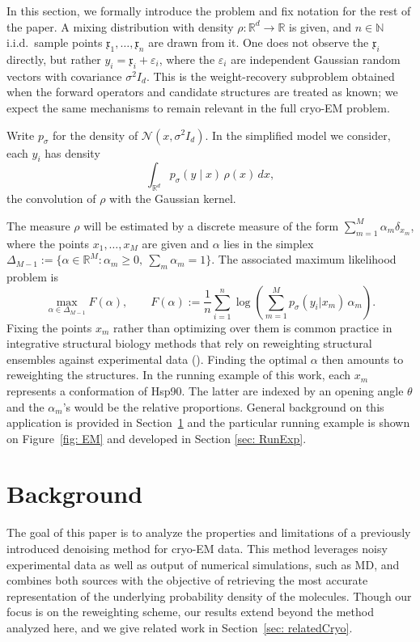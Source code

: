 \documentclass[12pt]{iopart}
\providecommand{\reals}{\mathbb{R}}
\providecommand{\eps}{\varepsilon}
\theoremstyle{remark}
\begin{document}
In this section, we formally introduce the problem and fix notation for the rest of the paper. A mixing distribution with
density $\rho:\reals^d\to\reals$ is given, and $n \in \mathbb{N}$ i.i.d.\ sample points
$\mathfrak{x}_1,\ldots,\mathfrak{x}_n$ are drawn from it. One does not
observe the $\mathfrak{x}_i$ directly, but rather
$y_i=\mathfrak{x}_i+\eps_i$, where the $\eps_i$ are independent Gaussian
random vectors with covariance $\sigma^2 I_d$. This is the weight-recovery
subproblem obtained when the forward operators and candidate structures are
treated as known; we expect the same mechanisms to remain relevant in the full
cryo-EM problem.




Write $p_\sigma$ for the density of $\mathcal{N}(x,\sigma^2 I_d)$.
In the simplified model we consider, each $y_i$ has density
\[
  \int_{\mathbb{R}^d} p_\sigma(y \mid x)\,\rho(x)\,dx,
\]
the convolution of $\rho$ with the Gaussian kernel.

The measure $\rho$ will be estimated by a discrete measure of the form
$\sum_{m=1}^M \alpha_m\delta_{x_m}$, where the points $x_1,\ldots,x_M$ are
given and $\alpha$ lies in the simplex
$\Delta_{M-1}:=\{\alpha\in\reals^M:\alpha_m\geq 0,\ \sum_m\alpha_m=1\}$.
The associated maximum likelihood problem is
\begin{equation}
\label{eq: MainOpt}
\max_{\alpha\in\Delta_{M-1}} F(\alpha),
\qquad
F(\alpha):=\frac1n\sum_{i=1}^n\log\!\left(\sum_{m=1}^M p_\sigma(y_i\vert x_m)\,\alpha_m\right).
\end{equation}
Fixing the points $x_m$ rather than optimizing over them is common practice in integrative structural biology methods that rely on reweighting structural ensembles against experimental data (\cite{bottaro2020integrating}). Finding the optimal $\alpha$
then amounts to reweighting the structures. 
In the running example of this work, each $x_m$ represents a conformation of Hsp90. The latter are indexed by an opening angle $\theta$ and the $\alpha_m$'s would be the relative proportions.
General background on this
application is provided in Section~\ref{sec: Background} and the particular running example is shown on Figure~\ref{fig: EM} and developed in  Section \ref{sec: RunExp}. 







\section{Background}
\label{sec: Background}
The goal of this paper is to analyze the properties and limitations of a previously introduced denoising method \citep{tang2023ensemble, evans2026counting} for cryo-EM data.
This method leverages noisy experimental data as well as output of numerical simulations, such as MD, and combines both sources with the objective of retrieving the most accurate representation of the underlying probability density of the molecules.
Though our focus is on the reweighting scheme, our results extend beyond the method analyzed here, and we give related work in Section~\ref{sec: relatedCryo}.
\end{document}
